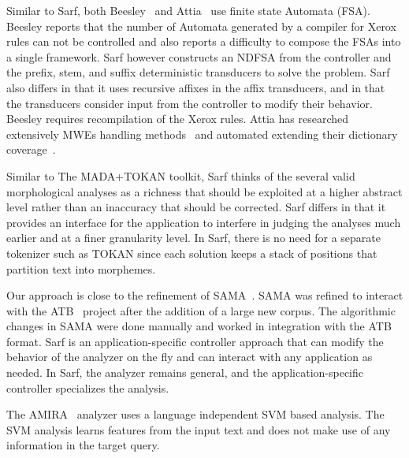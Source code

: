 \documentclass[11pt]{article}
\begin{document}
Similar to Sarf, both Beesley~ and Attia~ use
finite state Automata (FSA). 
Beesley reports that the number of Automata generated by a compiler
for Xerox rules can not be controlled and also reports a difficulty 
to compose the FSAs into a single framework. 
Sarf however constructs an NDFSA from
the controller and the prefix, stem, and suffix deterministic 
transducers to solve the problem.
Sarf also differs in that it uses recursive affixes in the 
affix transducers, and in that the transducers consider
input from the controller to modify their behavior. 
Beesley requires recompilation of the Xerox rules. 
Attia has researched extensively MWEs handling methods~\cite{Attia:06} and 
automated extending their dictionary coverage~\cite{Attia:10}. 

Similar to The MADA+TOKAN toolkit, Sarf thinks of
the several valid morphological analyses as a richness that 
should be exploited at a higher abstract level rather than
an inaccuracy that should be corrected. 
Sarf differs in that it provides an interface for the 
application to interfere in judging the analyses much earlier and
at a finer granularity level. 
In Sarf, there is no need for a separate tokenizer such as
TOKAN since each solution keeps a stack of positions
that partition text into morphemes.


Our approach is close to the refinement of SAMA~\cite{Maamouri:10}.
SAMA was refined to interact with
the ATB~\cite{Maamouri:04} project after the addition of a large 
new corpus. 
The algorithmic changes in SAMA were
done manually and worked in integration with the ATB format. 
Sarf is an application-specific controller approach that can modify 
the behavior of the analyzer on the fly and can interact
with any application as needed. 
In Sarf, the analyzer remains general, and the 
application-specific controller specializes the analysis.

The AMIRA~\cite{Diab:07} analyzer uses 
a language independent SVM based analysis. 
The SVM analysis learns features from the input text 
and does not make use of any information 
in the target query.
\end{document}

